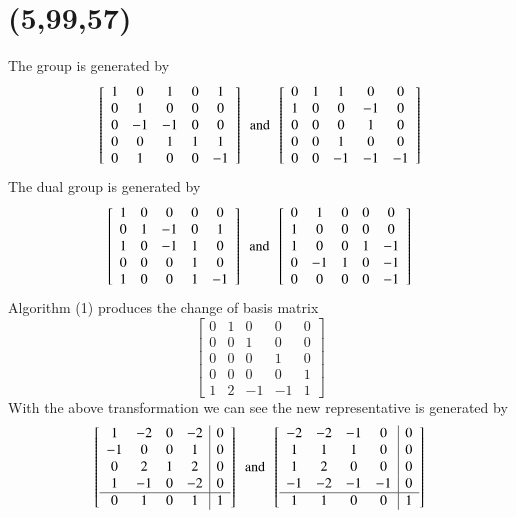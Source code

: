   \section{(5,99,57)}
The group is generated by 
$$
 \left[ \begin {array}{ccccc} 1&0&1&0&1\\0&1&0&0&0
\\0&-1&-1&0&0\\0&0&1&1&1
\\0&1&0&0&-1\end {array} \right] 
\,\,\, \text{and} \,\,\,
 \left[ \begin {array}{ccccc} 0&1&1&0&0\\1&0&0&-1&0
\\0&0&0&1&0\\0&0&1&0&0
\\0&0&-1&-1&-1\end {array} \right] 
$$
The dual group is generated by  
$$
\left[ \begin {array}{ccccc} 1&0&0&0&0\\0&1&-1&0&1
\\1&0&-1&1&0\\0&0&0&1&0
\\1&0&0&1&-1\end {array} \right] 
\,\,\, \text{and} \,\,\,
 \left[ \begin {array}{ccccc} 0&1&0&0&0\\1&0&0&0&0
\\1&0&0&1&-1\\0&-1&1&0&-1
\\0&0&0&0&-1\end {array} \right] 
$$
Algorithm (1) produces the change of basis matrix 
$$
\left[ \begin {array}{ccccc} 0&1&0&0&0\\ 0&0&1&0&0
\\ 0&0&0&1&0\\ 0&0&0&0&1
\\ 1&2&-1&-1&1\end {array} \right] 
$$
With the above transformation we can see the new representative is generated by 
$$
\left[ \begin {array}{cccc|c} 1&-2&0&-2&0\\-1&0&0&1
&0\\0&2&1&2&0\\1&-1&0&-2&0
\\ \hline 0&1&0&1&1\end {array} \right] 
\,\,\, \text{and} \,\,\,
 \left[ \begin {array}{cccc|c} -2&-2&-1&0&0\\1&1&1&0
&0\\1&2&0&0&0\\-1&-2&-1&-1&0
\\ \hline 1&1&0&0&1\end {array} \right] 
$$
